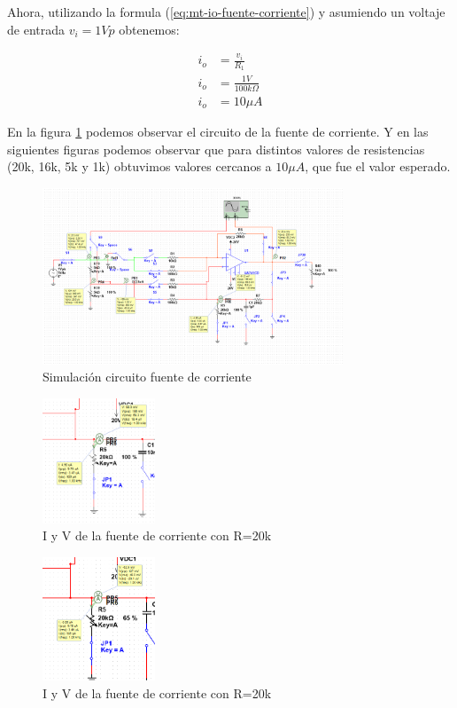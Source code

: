 Ahora, utilizando la formula (\ref{eq:mt-io-fuente-corriente}) y asumiendo un voltaje de entrada $v_i = 1Vp$ obtenemos:

\begin{align*}
    i_o &= \frac{v_i}{R_1}  \\
    i_o &= \frac{1V}{100k\Omega}  \\
    i_o & = 10\mu A
\end{align*}

En la figura \ref{fig:sim-fuente-corriente} podemos observar el circuito de la fuente de corriente. Y en las siguientes figuras podemos observar que para distintos valores de resistencias (20k, 16k, 5k y 1k) obtuvimos valores cercanos a $10\mu A$, que fue el valor esperado.

\begin{figure}[ht]
    \centering
    \includegraphics[width=0.8\textwidth]{src/images/simulaciones/fuente-corriente-rango-amplio.png}
    \caption{Simulación circuito fuente de corriente}
    \label{fig:sim-fuente-corriente}
\end{figure}
\begin{figure}[ht]
    \centering
    \includegraphics[width=0.3\textwidth]{src/images/simulaciones/fuente-corriente-mejor-20k.png}
    \caption{I y V de la fuente de corriente con R=20k}
    \label{fig:sim-fuente-corriente-20k}
\end{figure}
\begin{figure}[ht]
    \centering
    \includegraphics[width=0.3\textwidth]{src/images/simulaciones/fuente-corriente-mejor-13k.png}
    \caption{I y V de la fuente de corriente con R=20k}
    \label{fig:sim-fuente-corriente-13k}
\end{figure}
